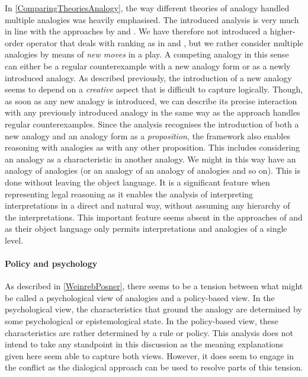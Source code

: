 				In \autoref{ComparingTheoriesAnalogy}, the way different theories of analogy handled multiple analogies was heavily emphasised. The introduced analysis is very much in line with the approaches by \textcite{Rahman2017} and \textcite{Brewer1996}. We have therefore not introduced a higher-order operator that deals with ranking as in \textcite{Bartha2010} and \textcite{Prakken1996}, but we rather consider multiple analogies by means of \textit{new moves} in a play. A competing analogy in this sense can either be a regular counterexample with a new analogy form or as a newly introduced analogy. As described previously, the introduction of a new analogy seems to depend on a \textit{creative} aspect that is difficult to capture logically. Though, as soon as any new analogy is introduced, we can describe its precise interaction with any previously introduced analogy in the same way as the approach handles regular counterexamples. Since the analysis recognises the introduction of both a new analogy and an analogy form as a \textit{proposition}, the framework also enables reasoning with analogies as with any other proposition. This includes considering an analogy as a characteristic in another analogy. We might in this way have an analogy of analogies (or an analogy of an analogy of analogies and so on). This is done without leaving the object language. It is a significant feature when representing legal reasoning as it enables the analysis of interpreting interpretations in a direct and natural way, without assuming any hierarchy of the interpretations. This important feature seems absent in the approaches of \textcite{Bartha2010} and \textcite{Prakken1996} as their object language only permits interpretations and analogies of a single level. 
			
				\paragraph{Policy and psychology}
			
				As described in \autoref{WeinrebPosner}, there seems to be a tension between what might be called a psychological view of analogies and a policy-based view. In the psychological view, the characteristics that ground the analogy are determined by some psychological or epistemological state. In the policy-based view, these characteristics are rather determined by a rule or policy. This analysis does not intend to take any standpoint in this discussion as the meaning explanations given here seem able to capture both views. However, it does seem to engage in the conflict as the dialogical approach can be used to resolve parts of this tension. 
				

